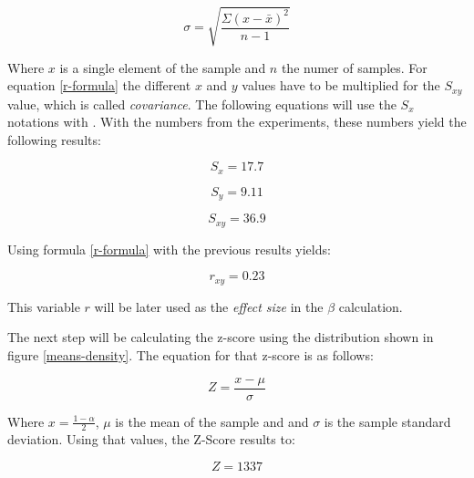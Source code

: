             \begin{equation}\label{stddev}
                \sigma = \sqrt{\frac{\Sigma(x-\bar{x})^{2}}{n-1}}
            \end{equation}            
            
            Where $x$ is a single element of the sample and $n$ the numer of samples. For equation \ref*{r-formula} the different $x$ and $y$ values have to be multiplied for the $S_{xy}$ value, which is called \textit{covariance}. The following equations will use the $S_{x}$ notations with . With the numbers from the experiments, these numbers yield the following results:

            \begin{equation}\label{sx}
                S_{x} = 17.7
            \end{equation} 

            \begin{equation}\label{sy}
                S_{y} = 9.11
            \end{equation}

            \begin{equation}\label{sxy}
                S_{xy} = 36.9
            \end{equation}
            
            Using formula \ref*{r-formula} with the previous results yields:

            \begin{equation}\label{r-value}
                r_{xy} = 0.23
            \end{equation}

            This variable $r$ will be later used as the \textit{effect size} in the $\beta$ calculation.

            \medskip

            The next step will be calculating the z-score using the distribution shown in figure \ref*{means-density}. The equation for that z-score is as follows:

            \begin{equation}\label{z-score}
                Z = \frac{x-\mu}{\sigma}
            \end{equation}            

            Where $x=\frac{1-\alpha}{2}$, $\mu$ is the mean of the sample and and $\sigma$ is the sample standard deviation. Using that values, the Z-Score results to:

            \begin{equation}\label{z-result}
                Z = 1337
            \end{equation}

